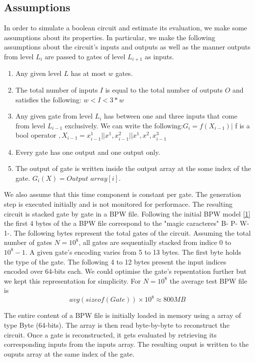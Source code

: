 \subsection{Assumptions}
In order to simulate a boolean circuit and estimate its evaluation, we make some assumptions about its properties. In particular, we make the following assumptions about the circuit's inputs and outputs as well as the manner outputs from level $L_i$ are passed to gates of level $L_{i+1}$ as inputs.
\begin{enumerate}  
\item Any given level $L$ has at most $w$ gates.
\item The total number of inputs $I$ is equal to the total number of outputs $O$ and satisfies the following: $ w < I < 3*w $
\item Any given gate from level $L_i$ has between one and three inputs that come from level $L_{i-1}$ exclusively. We can write the following:\break $G_i = f(X_{i-1}) |$ f is a bool operator $, X_{i-1} = {x^1_{i-1} || x^1,x^2_{i-1} || x^1,x^2,x^3_{i-1}}$
\item Every gate has one output and one output only.
\item The output of gate is written inside the output array at the some index of the gate. $G_i(X) = Output$ $array[i]$.
\end{enumerate}
We also assume that this time component is constant per gate. The generation step is executed initially and is not monitored for performace. The resulting circuit is stacked gate by gate in a BPW file. Following the initial BPW model \ref{1} the first 4 bytes of the a BPW file correspond to the "magic caracteres" B- P- W- 1-. The following bytes represent the total gates of the circuit. Assuming the total number of gates $N = 10^8$, all gates are sequentially stacked from indice $0$ to $10^8-1$. A given gate's encoding varies from 5 to 13 bytes. The first byte holds the type of the gate. The following 4 to 12 bytes present the input indices encoded over 64-bits each. We could optimise the gate's repsentation further but we kept this representation for simplicity. For $ N = 10^8$ the average test BPW file is 
\begin{equation}
avg(sizeof(Gate)) \times 10^8 \approx 800 MB
\end{equation}

The entire content of a BPW file is initially loaded in memory using a array of type Byte (64-bits). The array is then read byte-by-byte to reconstruct the circuit. Once a gate is reconstructed, it gets evaluated by retrieving its corresponding inputs from the inputs array. The resulting ouput is written to the ouputs array at the same index of the gate.

